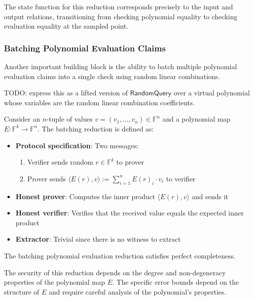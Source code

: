The state function for this reduction corresponds precisely to the input and output relations, transitioning from checking polynomial equality to checking evaluation equality at the sampled point.

\subsubsection{Batching Polynomial Evaluation Claims}

Another important building block is the ability to batch multiple polynomial evaluation claims into a single check using random linear combinations.

TODO: express this as a lifted version of $\mathsf{RandomQuery}$ over a virtual polynomial whose
variables are the random linear combination coefficients.

\begin{definition}
    \label{def:batching_polynomial_evaluation}
    Consider an $n$-tuple of values $v = (v_1, \ldots, v_n) \in \mathbb{F}^n$ and a polynomial map $E : \mathbb{F}^k \to \mathbb{F}^n$. The batching reduction is defined as:
    \begin{itemize}
        \item \textbf{Protocol specification}: Two messages:
        \begin{enumerate}
            \item Verifier sends random $r \in \mathbb{F}^k$ to prover
            \item Prover sends $\langle E(r), v \rangle := \sum_{i=1}^n E(r)_i \cdot v_i$ to verifier
        \end{enumerate}
        \item \textbf{Honest prover}: Computes the inner product $\langle E(r), v \rangle$ and sends it
        \item \textbf{Honest verifier}: Verifies that the received value equals the expected inner product
        \item \textbf{Extractor}: Trivial since there is no witness to extract
    \end{itemize}
\end{definition}

\begin{theorem}
    The batching polynomial evaluation reduction satisfies perfect completeness.
\end{theorem}

\begin{remark}
    The security of this reduction depends on the degree and non-degeneracy properties of the polynomial map $E$. The specific error bounds depend on the structure of $E$ and require careful analysis of the polynomial's properties.
\end{remark}

